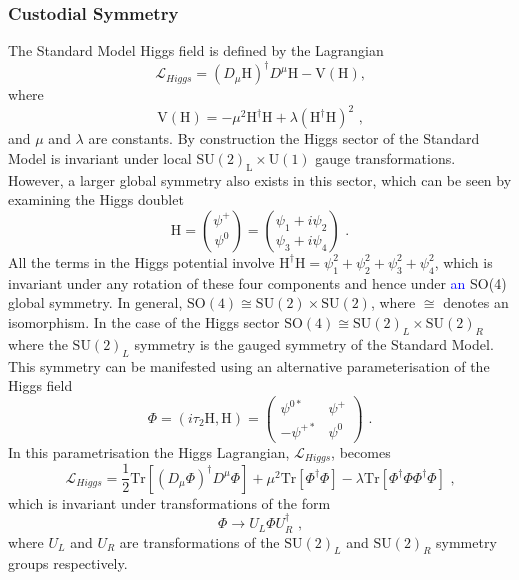 \subsubsection{Custodial Symmetry}
The Standard Model Higgs field is defined by the Lagrangian
%
\begin{equation}
\mathcal{L}_{Higgs} = (D_{\mu}\text{H})^{\dagger}D^{\mu}\text{H} - \text{V}(\text{H}) \text{,}
\end{equation}
%
\noindent where
%
\begin{equation}
\text{V}(\text{H}) = -\mu^{2}\text{H}^{\dagger}\text{H} + \lambda (\text{H}^{\dagger}\text{H})^{2} \text{ ,}
\end{equation}
%
\noindent and $\mu$ and $\lambda$ are constants.  By construction the Higgs sector of the Standard Model is invariant under local $\text{SU}(2)_{\text{L}} \times \text{U}(1)$ gauge transformations.  However, a larger global symmetry also exists in this sector, which can be seen by examining the Higgs doublet \cite{Ellis:1991qj}
%
\begin{equation}
\text{H} = \binom{\psi^{+}}{\psi^{0}} = \binom{\psi_{1} + i\psi_{2}}{\psi_{3} + i\psi_{4}} \text{ .}
\end{equation}
%
\noindent All the terms in the Higgs potential involve $\text{H}^{\dagger}\text{H} = \psi_{1}^{2} + \psi_{2}^{2} + \psi_{3}^{2} + \psi_{4}^{2}$, which is invariant under any rotation of these four components and hence under \textcolor{blue}{an} SO(4) global symmetry.  In general, $\text{SO}(4) \cong \text{SU}(2) \times \text{SU}(2)$, where $\cong$ denotes an isomorphism.  In the case of the Higgs sector $\text{SO}(4) \cong \text{SU}(2)_{L} \times \text{SU}(2)_{R}$ where the $\text{SU}(2)_{L}$ symmetry is the gauged symmetry of the Standard Model.  This symmetry can be manifested using an alternative parameterisation \cite{Andersen:2011yj} of the Higgs field
%
\begin{equation}
\Phi = (i\tau_{2}\text{H}, \text{H}) = 
\begin{pmatrix}
\psi^{0*} & \psi^{+} \\
-\psi^{+*} & \psi^{0}
\end{pmatrix} 
\text{ .}
\end{equation}
%
\noindent In this parametrisation the Higgs Lagrangian, $\mathcal{L}_{Higgs}$, becomes
%
\begin{equation}
\mathcal{L}_{Higgs} =  \frac{1}{2}\text{Tr}[(D_{\mu}\Phi)^{\dagger}D^{\mu}\Phi] + \mu^{2}\text{Tr}[\Phi^{\dagger}\Phi] - \lambda \text{Tr}[\Phi^{\dagger}\Phi\Phi^{\dagger}\Phi] \text{ ,}
\end{equation}
%
\noindent which is invariant under transformations of the form
%
\begin{equation}
\Phi \rightarrow U_{L} \Phi U_{R}^{\dagger} \text{ ,}
\end{equation}
%
\noindent where $U_{L}$ and $U_{R}$ are transformations of the $\text{SU}(2)_{L}$ and $\text{SU}(2)_{R}$ symmetry groups respectively.

